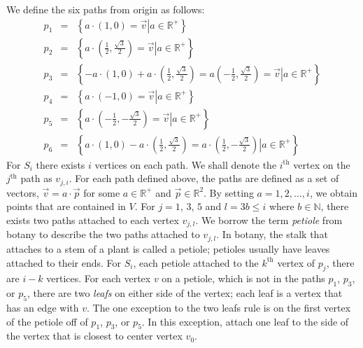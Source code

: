 \documentclass[10pt]{CSUNthesis}
\theoremstyle{plain}%
\theoremstyle{definition}
\theoremstyle{remark}
\newcommand{\ith}{i^\text{th}}
\newcommand{\jth}{j^\text{th}}
\newcommand{\bbR}{{\mathbb{R}}}
\newcommand{\bbN}{{\mathbb{N}}}
\newcommand{\set}[2]{{\left\lbrace \left.  #1 \left\vert #2  \right.\right.\right\rbrace  }}
\newcommand{\lr}[1]{\left( #1 \right)}
\begin{document}
We define the six paths from origin as follows:      
\begin{eqnarray*}
p_1 &=& \set{a\cdot\lr{1,0} = \vec{v}}{a \in \bbR^+}\\
p_2 &=& \set{a\cdot\lr{\frac{1}{2},\frac{\sqrt{3}}{2}} = \vec{v}}{a \in \bbR^+}\\
p_3 &=& \set{-a\cdot \lr{1,0} + a \cdot \lr{\frac{1}{2},\frac{\sqrt{3}}{2}} = a\lr{-\frac{1}{2},\frac{\sqrt{3}}{2}} = \vec{v}}{a \in \bbR^+}\\
p_4 &=& \set{a \cdot \lr{-1,0} = \vec{v}}{a \in \bbR^+}\\
p_5 &=& \set{a \cdot \lr{-\frac{1}{2},-\frac{\sqrt{3}}{2}}  = \vec{v}}{a \in \bbR^+}\\
p_6 &=& \set{ a\cdot \lr{1,0} - a \cdot \lr{\frac{1}{2},\frac{\sqrt{3}}{2}}= a \cdot \lr{\frac{1}{2}, -\frac{\sqrt{3}}{2}}}{a \in \bbR^+} 
\end{eqnarray*}
For $S_i$ there exists $i$ vertices on each path.  We shall denote the $\ith$ vertex on the $\jth$ path as $v_{j,i}$.  
For each path defined above, the paths are defined as a set of vectors, $\vec{v} = a \cdot \vec{p}$  for some $a \in \bbR^+$ and $\vec{p} \in \bbR^2$.  
By setting $a = 1,2,\dots, i$, we obtain points that are contained in $V$.  
For $j = 1$, $3$, $5$ and $l = 3 b \leq i$ where $b \in \bbN$,  there exists two paths attached to each vertex $v_{j,l}$.  
We borrow the term \textit{petiole} from botany to describe the two paths attached to $v_{j,l}$.  
In botany, the stalk that attaches to a stem of a plant is called a petiole; petioles usually have leaves attached to their ends.  
For $S_i$, each petiole attached to the $k^\text{th}$ vertex of $p_j$, there are $i-k$ vertices. 
For each vertex $v$ on a petiole, which is not in the paths $p_1$, $p_3$, or $p_5$, there are two \textit{leafs} on either side of the vertex; each leaf is a vertex that has an edge with $v$.  
The one exception to the two leafs rule is on the first vertex of the petiole off of $p_1$, $p_3$, or $p_5$.  
In this exception, attach one leaf to the side of the vertex that is closest to center vertex $v_0$.
\end{document}
